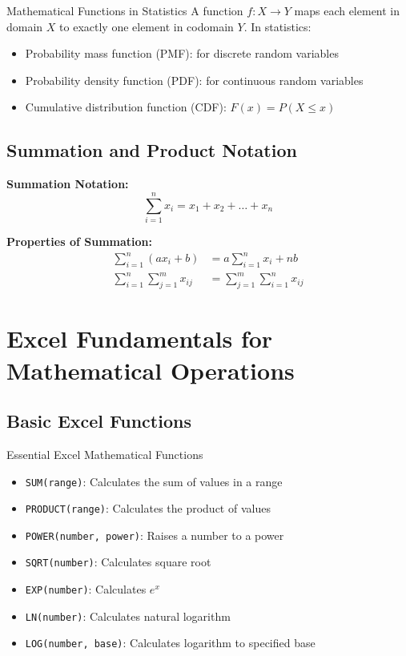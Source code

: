 \documentclass[12pt,a4paper]{book}
\begin{document}
\begin{definition}{Mathematical Functions in Statistics}
A function $f: X \rightarrow Y$ maps each element in domain $X$ to exactly one element in codomain $Y$. In statistics:
\begin{itemize}
    \item Probability mass function (PMF): for discrete random variables
    \item Probability density function (PDF): for continuous random variables
    \item Cumulative distribution function (CDF): $F(x) = P(X \leq x)$
\end{itemize}
\end{definition}

\subsection{Summation and Product Notation}

\textbf{Summation Notation:}
\[
\sum_{i=1}^{n} x_i = x_1 + x_2 + \ldots + x_n
\]

\textbf{Properties of Summation:}
\begin{align}
\sum_{i=1}^{n} (ax_i + b) &= a\sum_{i=1}^{n} x_i + nb\\
\sum_{i=1}^{n} \sum_{j=1}^{m} x_{ij} &= \sum_{j=1}^{m} \sum_{i=1}^{n} x_{ij}
\end{align}

\section{Excel Fundamentals for Mathematical Operations}

\subsection{Basic Excel Functions}

\begin{example}{Essential Excel Mathematical Functions}
\begin{itemize}
    \item \texttt{SUM(range)}: Calculates the sum of values in a range
    \item \texttt{PRODUCT(range)}: Calculates the product of values
    \item \texttt{POWER(number, power)}: Raises a number to a power
    \item \texttt{SQRT(number)}: Calculates square root
    \item \texttt{EXP(number)}: Calculates $e^x$
    \item \texttt{LN(number)}: Calculates natural logarithm
    \item \texttt{LOG(number, base)}: Calculates logarithm to specified base
\end{itemize}
\end{example}
\end{document}
